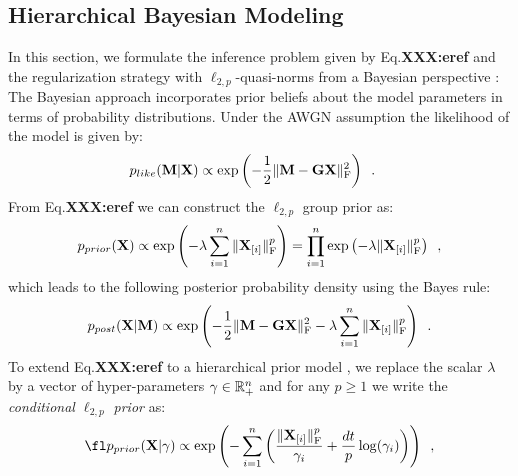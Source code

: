 \subsection{Hierarchical Bayesian Modeling}
\label{sub:HBM}

In this section, we formulate the inference problem given by Eq.\textbf{XXX:eref}%
 and the regularization strategy with $\ell_{2,p}$-quasi-norms from a Bayesian perspective \cite{KaSo05,Lu14}: The Bayesian approach incorporates prior beliefs about the model parameters in terms of probability distributions. Under the AWGN assumption the likelihood of the model is given by:
\begin{eqnarray} \label{eq:like}
p_{like}(\mathbf{M}|\mathbf{X}) &\propto \exp \left( - \frac{1}{2} \|{\mathbf{M} - \mathbf{G} \mathbf{X}}\|_{\rm F}^2 \right) \enspace.
\end{eqnarray}
From Eq.\textbf{XXX:eref}%
 we can construct the $\ell_{2,p}$ group prior as:
 \begin{equation} \label{eq:prior}
p_{prior}(\mathbf{X}) \propto \exp \left( - \lambda \sum_{i=1}^n \|{\mathbf{X}_{[i]}}\|_{\rm F}^p \right)
= \prod_{i=1}^n \exp \left( - \lambda \|{\mathbf{X}_{[i]}}\|_{\rm F}^p \right) \enspace,
\end{equation}
which leads to the following posterior probability density using the Bayes rule:
\begin{equation} \label{eq:post}
p_{post}(\mathbf{X}|\mathbf{M}) \propto \exp \left( - \frac{1}{2} \|{\mathbf{M} - \mathbf{G} \mathbf{X}}\|_{\rm F}^2 - \lambda \sum_{i=1}^n \|{\mathbf{X}_{[i]}}\|_{\rm F}^p \right) \enspace.
\end{equation}
To extend Eq.\textbf{XXX:eref}%
 to a hierarchical prior model \cite{mackay2003information}, we replace the scalar $\lambda$ by a vector of hyper-parameters $\gamma \in \mathbb{R}^{n}_+$ and for any $p \geq 1$ we write the \emph{conditional $\ell_{2,p}$ prior} as:
\begin{equation} \label{eq:condprior}
\fl \hiprior
\propto \exp \left( - \sum_{i=1}^n \left( \frac{\fronorm{\bfX_{[i]}}^p}{\gamma_i} + \frac{d t}{p} \log(\gamma_i)\right)\right) \enspace,
\end{equation}


